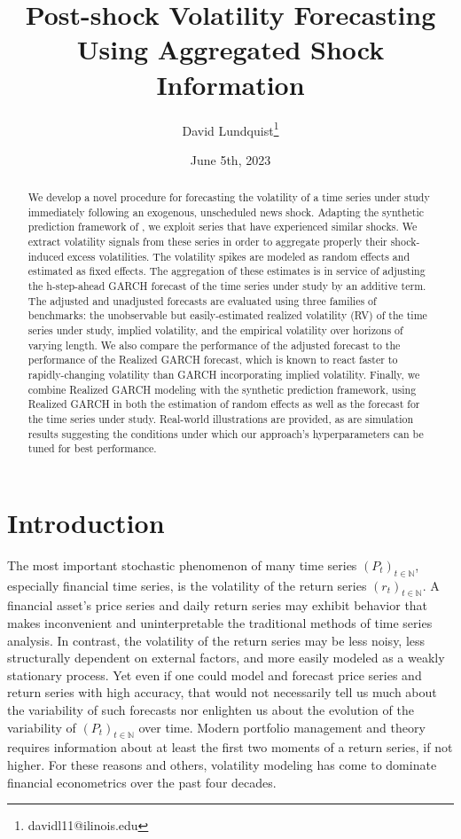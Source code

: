 \documentclass[11pt]{article}
\title{Post-shock Volatility Forecasting Using Aggregated Shock Information}
\author{David Lundquist\thanks{davidl11@ilinois.edu} }
\affil{Department of Statistics, University of Illinois at Urbana-Champaign}
\date{June 5th, 2023}
\theoremstyle{definition}
\begin{document}
\maketitle

\begin{abstract}
We develop a novel procedure for forecasting the volatility of a time series under study immediately following an exogenous, unscheduled news shock.  Adapting the synthetic prediction framework of \citet{lin2021minimizing}, we exploit series that have experienced similar shocks.  We extract volatility signals from these series in order to aggregate properly their shock-induced excess volatilities.  The volatility spikes are modeled as random effects and estimated as fixed effects.  The aggregation of these estimates is in service of adjusting the h-step-ahead GARCH forecast of the time series under study by an additive term.  The adjusted and unadjusted forecasts are evaluated using three families of benchmarks: the unobservable but easily-estimated realized volatility (RV) of the time series under study, implied volatility, and the empirical volatility over horizons of varying length.  We also compare the performance of the adjusted forecast to the performance of the Realized GARCH forecast, which is known to react faster to rapidly-changing volatility than GARCH incorporating implied volatility.   Finally, we combine Realized GARCH modeling with the synthetic prediction framework, using Realized GARCH in both the estimation of random effects as well as the forecast for the time series under study.  Real-world illustrations are provided, as are simulation results suggesting the conditions under which our approach's hyperparameters can be tuned for best performance.
\end{abstract}


\section{Introduction}

The most important stochastic phenomenon of many time series $(P_{t})_{t\in\mathbb{N}}$, especially financial time series, is the volatility of the return series $(r_{t})_{t\in\mathbb{N}}$.  A financial asset's price series and daily return series may exhibit behavior that makes inconvenient and uninterpretable the traditional methods of time series analysis.  In contrast, the volatility of the return series may be less noisy, less structurally dependent on external factors, and more easily modeled as a weakly stationary process.  Yet even if one could model and forecast price series and return series with high accuracy, that would not necessarily tell us much about the variability of such forecasts nor enlighten us about the evolution of the variability of $(P_{t})_{t\in\mathbb{N}}$ over time. Modern portfolio management and theory requires information about at least the first two moments of a return series, if not higher.  For these reasons and others, volatility modeling has come to dominate financial econometrics over the past four decades.  
\end{document}
